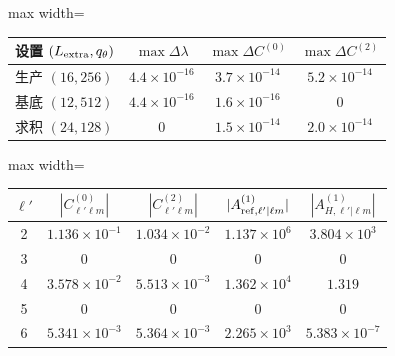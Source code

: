 \documentclass[UTF8,fontset=fandol,11pt,a4paper]{ctexart}
\begin{document}
\par\addvspace{12pt}\noindent\begin{minipage}{\linewidth}
\centering\fontsize{9.5}{12}\selectfont\setlength{\tabcolsep}{3pt}\renewcommand{\arraystretch}{1.18}
\label{audit:tab:angular-convergence}
\begin{adjustbox}{max width=\linewidth}
\begin{tabular}{lccc}
\toprule
设置 $(L_{\rm extra},q_\theta)$ & $\max\Delta\lambda$
& $\max\Delta C^{(0)}$ & $\max\Delta C^{(2)}$\\
\midrule
生产 $(16,256)$ & $4.4\times10^{-16}$ & $3.7\times10^{-14}$ & $5.2\times10^{-14}$\\
基底 $(12,512)$ & $4.4\times10^{-16}$ & $1.6\times10^{-16}$ & $0$\\
求积 $(24,128)$ & $0$ & $1.5\times10^{-14}$ & $2.0\times10^{-14}$\\
\bottomrule\end{tabular}\end{adjustbox}
\end{minipage}\par\addvspace{9pt}




\par\addvspace{12pt}\noindent\begin{minipage}{\linewidth}
\centering\fontsize{9.5}{12}\selectfont\setlength{\tabcolsep}{3pt}\renewcommand{\arraystretch}{1.18}
\label{audit:tab:channels}
\begin{adjustbox}{max width=\linewidth}
\begin{tabular}{c c c c c}
\toprule
$\ell'$ & $|C^{(0)}_{\ell'\ell m}|$ & $|C^{(2)}_{\ell'\ell m}|$
& $|A_{{\rm ref},\ell'|\ell m}^{(1)}|$
& $|A_{H,\ell'|\ell m}^{(1)}|$\\
\midrule
2 & $1.136\times10^{-1}$ & $1.034\times10^{-2}$ & $1.137\times10^{6}$ & $3.804\times10^{3}$\\
3 & $0$ & $0$ & $0$ & $0$\\
4 & $3.578\times10^{-2}$ & $5.513\times10^{-3}$ & $1.362\times10^{4}$ & $1.319$\\
5 & $0$ & $0$ & $0$ & $0$\\
6 & $5.341\times10^{-3}$ & $5.364\times10^{-3}$ & $2.265\times10^{3}$ & $5.383\times10^{-7}$\\
\bottomrule\end{tabular}\end{adjustbox}
\end{minipage}\par\addvspace{9pt}
\end{document}
